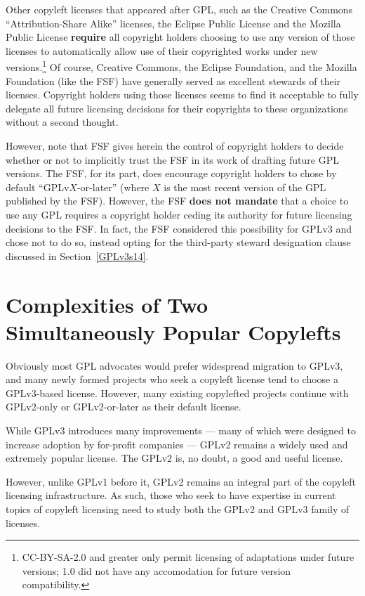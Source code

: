 Other copyleft licenses that appeared after GPL, such as the Creative Commons
``Attribution-Share Alike'' licenses, the Eclipse Public License and the
Mozilla Public License \textbf{require} all copyright holders choosing
to use any version of those licenses to automatically allow use of their
copyrighted works under new versions.\footnote{CC-BY-SA-2.0 and greater only
permit licensing of adaptations under future versions; 1.0 did not have
any accomodation for future version compatibility.}  Of course, Creative
Commons, the Eclipse Foundation, and the Mozilla Foundation (like the FSF)
have generally served as excellent stewards of their licenses.  Copyright
holders using those licenses seems to find it acceptable to fully delegate
all future licensing decisions for their copyrights to these organizations
without a second thought.

However, note that FSF gives herein the control of copyright holders to
decide whether or not to implicitly trust the FSF in its work of drafting
future GPL versions.  The FSF, for its part, does encourage copyright holders
to chose by default ``GPLv$X$-or-later'' (where $X$ is the most recent
version of the GPL published by the FSF).  However, the FSF \textbf{does not
  mandate} that a choice to use any GPL requires a copyright holder ceding
its authority for future licensing decisions to the FSF.  In fact, the FSF
considered this possibility for GPLv3 and chose not to do so, instead opting
for the third-party steward designation clause discussed in
Section~\ref{GPLv3s14}.

\section{Complexities of Two Simultaneously Popular Copylefts}

Obviously most GPL advocates would prefer widespread migration to GPLv3, and
many newly formed projects who seek a copyleft license tend to choose a
GPLv3-based license.  However, many existing copylefted projects continue
with GPLv2-only or GPLv2-or-later as their default license.

While GPLv3 introduces many improvements --- many of which were designed to
increase adoption by for-profit companies --- GPLv2 remains a widely used and
extremely popular license.  The GPLv2 is, no doubt, a good and useful
license.

However, unlike GPLv1 before it,
GPLv2 remains an integral part of the copyleft licensing infrastructure.  As such, those who seek to have expertise in current
topics of copyleft licensing need to study both the GPLv2 and GPLv3 family of
licenses.

